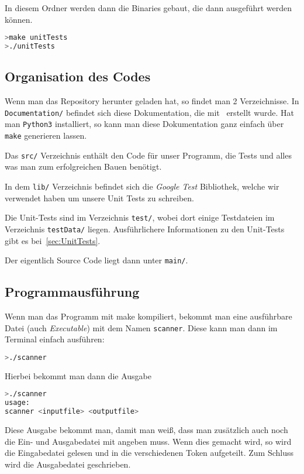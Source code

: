 In diesem Ordner werden dann die Binaries gebaut, die dann ausgeführt werden können.
\begin{lstlisting}[language=bash,numbers=none]
>make unitTests
>./unitTests
\end{lstlisting}

\subsection{Organisation des Codes}\label{sec:orga_code}
Wenn man das Repository herunter geladen hat, so findet man 2 Verzeichnisse. In \texttt{Documentation/} befindet sich diese Dokumentation, die mit \XeLaTeX\ erstellt wurde. Hat man \texttt{Python3} installiert, so kann man diese Dokumentation ganz einfach über \texttt{make} generieren lassen.

Das \texttt{src/} Verzeichnis enthält den Code für unser Programm, die Tests und alles was man zum erfolgreichen Bauen benötigt.

In dem \texttt{lib/} Verzeichnis befindet sich die \textit{Google Test} Bibliothek, welche wir verwendet haben um unsere Unit Tests zu schreiben.

Die Unit-Tests sind im Verzeichnis \texttt{test/}, wobei dort einige Testdateien im Verzeichnis \texttt{testData/} liegen. Ausführlichere Informationen zu den Unit-Tests gibt es bei~\ref{sec:UnitTests}.

Der eigentlich Source Code liegt dann unter \texttt{main/}.

\subsection{Programmausführung}
Wenn man das Programm mit make kompiliert, bekommt man eine ausführbare Datei (auch \textit{Executable}) mit dem Namen \texttt{scanner}. Diese kann man dann im Terminal einfach ausführen:

\begin{lstlisting}[language=bash,numbers=none]
>./scanner
\end{lstlisting}

Hierbei bekommt man dann die Ausgabe

\begin{lstlisting}[language=bash,numbers=none]
>./scanner
usage:
scanner <inputfile> <outputfile>
\end{lstlisting}

Diese Ausgabe bekommt man, damit man weiß, dass man zusätzlich auch noch die Ein- und Ausgabedatei mit angeben muss. Wenn dies gemacht wird, so wird die Eingabedatei gelesen und in die verschiedenen Token aufgeteilt. Zum Schluss wird die Ausgabedatei geschrieben.

